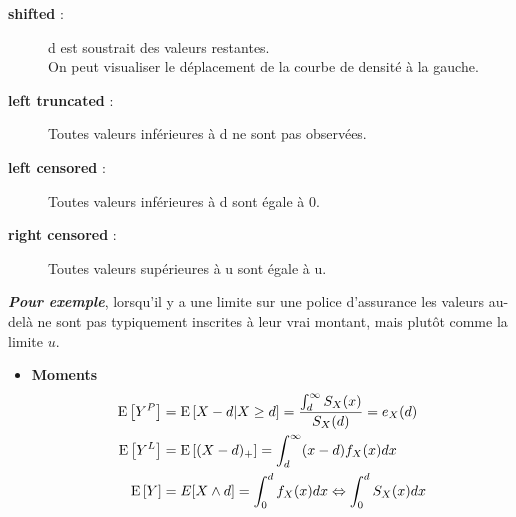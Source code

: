 \documentclass[10pt, french]{article}
\begin{document}
\begin{multicols*}{3}
\begin{itemize}
	\begin{description}
		\item[\textbf{shifted} :] d est soustrait des valeurs restantes. \\
		On peut visualiser le déplacement de la courbe de densité à la gauche.
		\item[\textbf{left truncated} :] Toutes valeurs inférieures à d ne sont pas observées.			
		\item[\textbf{left censored} :] Toutes valeurs inférieures à d sont égale à 0.
		\item[\textbf{right censored} :] Toutes valeurs supérieures à u sont égale à u.
	\end{description}	
	\textbf{\textit{Pour exemple}}, lorsqu'il y a une limite sur une police d'assurance les valeurs au-delà ne sont pas typiquement inscrites à leur vrai montant, mais plutôt comme la limite $u$.
\end{itemize}


\begin{itemize}
\item[] \textbf{Moments}
\begin{align*}
	\mathrm{E} \left[ Y^P \right] &= \mathrm{E} \left[ X-d | X \geq d \right] = \frac{\int_{d}^{\infty} S_X(x)}{S_X(d)} = e_X(d) \\
	\mathrm{E} \left[ Y^L \right] &= \mathrm{E} \left[ (X - d)_+ \right] = \int_{d}^{\infty} (x - d) f_X(x) dx \\
	\mathrm{E} \left[ Y \right] &= E[X \wedge d] = \int_0^d f_X(x) dx \Leftrightarrow \int_0^d S_X(x) dx
\end{align*}

\end{itemize}


\end{multicols*}
\end{document}
